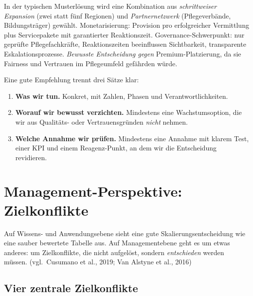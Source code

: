 \documentclass[11pt,a4paper,oneside]{article}
\newcommand{\quelle}[1]{{\footnotesize\color{lpGray}(#1)}}
\begin{document}
In der typischen Musterlösung wird eine Kombination aus \emph{schrittweiser Expansion} (zwei statt fünf Regionen) und \emph{Partnernetzwerk} (Pflegeverbände, Bildungsträger) gewählt. Monetarisierung: Provision pro erfolgreicher Vermittlung plus Servicepakete mit garantierter Reaktionszeit. Governance-Schwerpunkt: nur geprüfte Pflegefachkräfte, Reaktionszeiten beeinflussen Sichtbarkeit, transparente Eskalationsprozesse. \emph{Bewusste Entscheidung gegen} Premium-Platzierung, da sie Fairness und Vertrauen im Pflegeumfeld gefährden würde.

\begin{merkbox}
Eine gute Empfehlung trennt drei Sätze klar:
\begin{enumerate}
  \item \textbf{Was wir tun.} Konkret, mit Zahlen, Phasen und Verantwortlichkeiten.
  \item \textbf{Worauf wir bewusst verzichten.} Mindestens eine Wachstumsoption, die wir aus Qualitäts- oder Vertrauensgründen \emph{nicht} nehmen.
  \item \textbf{Welche Annahme wir prüfen.} Mindestens eine Annahme mit klarem Test, einer KPI und einem Reagenz-Punkt, an dem wir die Entscheidung revidieren.
\end{enumerate}
\end{merkbox}

\section{Management-Perspektive: Zielkonflikte}

Auf Wissens- und Anwendungsebene sieht eine gute Skalierungsentscheidung wie eine sauber bewertete Tabelle aus. Auf Managementebene geht es um etwas anderes: um Zielkonflikte, die nicht aufgelöst, sondern \emph{entschieden} werden müssen. \quelle{vgl.\ Cusumano et al., 2019; Van Alstyne et al., 2016}

\subsection{Vier zentrale Zielkonflikte}
\end{document}
